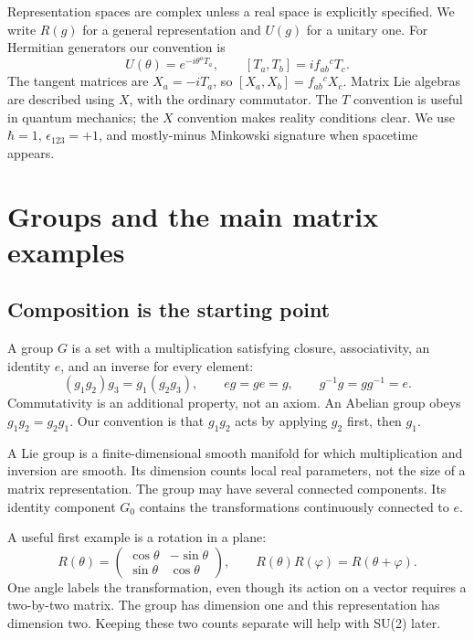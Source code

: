 \documentclass[11pt]{article}
\begin{document}
\begin{keyidea}[Conventions]
Representation spaces are complex unless a real space is explicitly
specified. We write \(R(g)\) for a general representation and \(U(g)\)
for a unitary one. For Hermitian generators our convention is
\[
U(\theta)=e^{-i\theta^a T_a},\qquad
[T_a,T_b]=i f_{ab}{}^cT_c.
\]
The tangent matrices are \(X_a=-iT_a\), so
\([X_a,X_b]=f_{ab}{}^cX_c\). Matrix Lie algebras are described using
\(X\), with the ordinary commutator. The \(T\) convention is useful in
quantum mechanics; the \(X\) convention makes reality conditions clear.
We use \(\hbar=1\), \(\epsilon_{123}=+1\), and mostly-minus Minkowski
signature when spacetime appears.
\end{keyidea}

\section{Groups and the main matrix examples}
\label{sec:groups}

\subsection{Composition is the starting point}
A group \(G\) is a set with a multiplication satisfying closure,
associativity, an identity \(e\), and an inverse for every element:
\begin{equation}
(g_1g_2)g_3=g_1(g_2g_3),\qquad eg=ge=g,\qquad
g^{-1}g=gg^{-1}=e.
\end{equation}
Commutativity is an additional property, not an axiom. An Abelian group
obeys \(g_1g_2=g_2g_1\). Our convention is that \(g_1g_2\) acts by
applying \(g_2\) first, then \(g_1\).

A Lie group is a finite-dimensional smooth manifold for which
multiplication and inversion are smooth. Its dimension counts local real
parameters, not the size of a matrix representation. The group may have
several connected components. Its identity component \(G_0\) contains
the transformations continuously connected to \(e\).

A useful first example is a rotation in a plane:
\[
 R(\theta)=\begin{pmatrix}\cos\theta&-\sin\theta\\
 \sin\theta&\cos\theta\end{pmatrix},\qquad
 R(\theta)R(\varphi)=R(\theta+\varphi).
\]
One angle labels the transformation, even though its action on a vector
requires a two-by-two matrix. The group has dimension one and this
representation has dimension two. Keeping these two counts separate
will help with SU(2) later.
\end{document}
